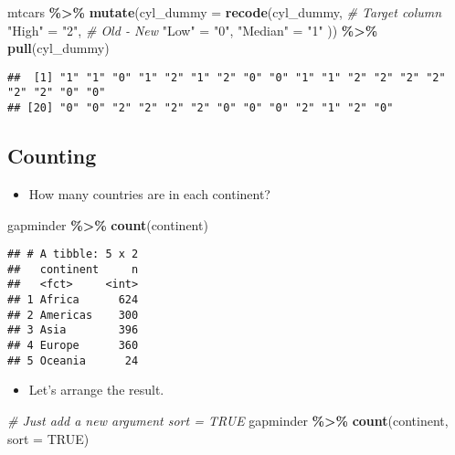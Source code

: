 \documentclass[
]{book}
\newenvironment{Shaded}{\begin{snugshade}}{\end{snugshade}}
\newcommand{\CommentTok}[1]{\textcolor[rgb]{0.56,0.35,0.01}{\textit{#1}}}
\newcommand{\DataTypeTok}[1]{\textcolor[rgb]{0.13,0.29,0.53}{#1}}
\newcommand{\KeywordTok}[1]{\textcolor[rgb]{0.13,0.29,0.53}{\textbf{#1}}}
\newcommand{\NormalTok}[1]{#1}
\newcommand{\OperatorTok}[1]{\textcolor[rgb]{0.81,0.36,0.00}{\textbf{#1}}}
\newcommand{\OtherTok}[1]{\textcolor[rgb]{0.56,0.35,0.01}{#1}}
\newcommand{\StringTok}[1]{\textcolor[rgb]{0.31,0.60,0.02}{#1}}
\providecommand{\tightlist}{%
  \setlength{\itemsep}{0pt}\setlength{\parskip}{0pt}}
\begin{document}
\begin{Shaded}
\begin{Highlighting}[]
\NormalTok{mtcars }\OperatorTok{\%\textgreater{}\%}
\StringTok{  }\KeywordTok{mutate}\NormalTok{(}\DataTypeTok{cyl\_dummy =} \KeywordTok{recode}\NormalTok{(cyl\_dummy, }\CommentTok{\# Target column}
    \StringTok{"High"}\NormalTok{ =}\StringTok{ "2"}\NormalTok{, }\CommentTok{\# Old {-} New}
    \StringTok{"Low"}\NormalTok{ =}\StringTok{ "0"}\NormalTok{,}
    \StringTok{"Median"}\NormalTok{ =}\StringTok{ "1"}
\NormalTok{  )) }\OperatorTok{\%\textgreater{}\%}
\StringTok{  }\KeywordTok{pull}\NormalTok{(cyl\_dummy)}
\end{Highlighting}
\end{Shaded}

\begin{verbatim}
##  [1] "1" "1" "0" "1" "2" "1" "2" "0" "0" "1" "1" "2" "2" "2" "2" "2" "2" "0" "0"
## [20] "0" "0" "2" "2" "2" "2" "0" "0" "0" "2" "1" "2" "0"
\end{verbatim}

\hypertarget{counting}{%
\subsection{Counting}\label{counting}}

\begin{itemize}
\tightlist
\item
  How many countries are in each continent?
\end{itemize}

\begin{Shaded}
\begin{Highlighting}[]
\NormalTok{gapminder }\OperatorTok{\%\textgreater{}\%}
\StringTok{  }\KeywordTok{count}\NormalTok{(continent)}
\end{Highlighting}
\end{Shaded}

\begin{verbatim}
## # A tibble: 5 x 2
##   continent     n
##   <fct>     <int>
## 1 Africa      624
## 2 Americas    300
## 3 Asia        396
## 4 Europe      360
## 5 Oceania      24
\end{verbatim}

\begin{itemize}
\tightlist
\item
  Let's arrange the result.
\end{itemize}

\begin{Shaded}
\begin{Highlighting}[]
\CommentTok{\# Just add a new argument \textasciigrave{}sort = TRUE\textasciigrave{}}
\NormalTok{gapminder }\OperatorTok{\%\textgreater{}\%}
\StringTok{  }\KeywordTok{count}\NormalTok{(continent, }\DataTypeTok{sort =} \OtherTok{TRUE}\NormalTok{)}
\end{Highlighting}
\end{Shaded}
\end{document}
